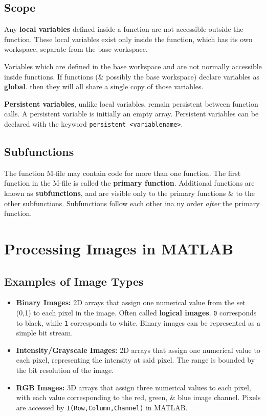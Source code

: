 \documentclass[11pt]{article}
\begin{document}
\subsection{Scope}
Any \textbf{local variables} defined inside a function are not accessible outside the function. 
These local variables exist only inside the function, which has its own workspace, separate from the base workspace.

Variables which are defined in the base workspace and are not normally accessible inside functions. 
If functions (\& possibly the base workspace) declare variables as \textbf{global}. then they will all share a single copy of those variables. 

\textbf{Persistent variables}, unlike local variables, remain persistent between function calls. 
A persistent variable is initially an empty array.
Persistent variables can be declared with the keyword \verb|persistent <variablename>|.

\subsection{Subfunctions}
The function M-file may contain code for more than one function. 
The first function in the M-file is called the \textbf{primary function}. 
Additional functions are known as \textbf{subfunctions}, and are visible only to the primary functions \& to the other subfunctions. 
Subfunctions follow each other ina ny order \textit{after} the primary function.

\section{Processing Images in MATLAB}
\subsection{Examples of Image Types}
\begin{itemize}
    \item   \textbf{Binary Images:} 2D arrays that assign one numerical value from the set (0,1) to each pixel in the image.
            Often called \textbf{logical images}. 
            \verb|0| corresponds to black, while \verb|1| corresponds to white. 
            Binary images can be represented as a simple bit stream.

    \item   \textbf{Intensity/Grayscale Images:} 2D arrays that assign one numerical value to each pixel, representing the intensity 
            at said pixel.
            The range is bounded by the bit resolution of the image.

    \item   \textbf{RGB Images:} 3D arrays that assign three numerical values to each pixel, with each value corresponding to the red, 
            green, \& blue image channel. 
            Pixels are accessed by \verb|I(Row,Column,Channel)| in MATLAB.
\end{itemize}
\end{document}
